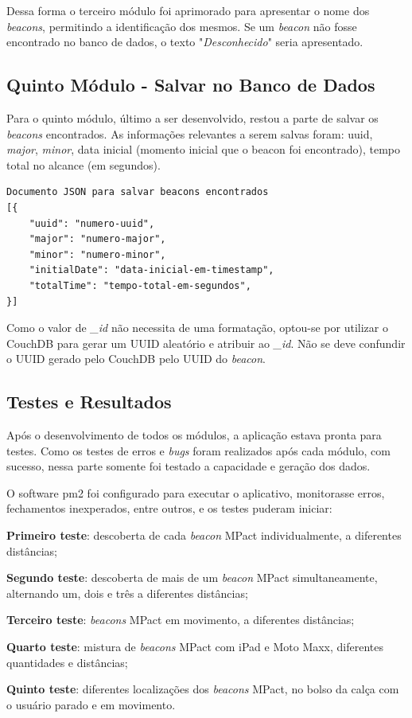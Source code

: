 \documentclass[
		12pt,				%
		openright,			%
		oneside,			%
		a4paper,			%
		chapter=TITLE,		%
		english,			%
		brazil				%
	]{abntex2}
\begin{document}
Dessa forma o terceiro módulo foi aprimorado para apresentar o nome dos \textit{beacons}, permitindo a identificação dos mesmos. Se um \textit{beacon} não fosse encontrado no banco de dados, o texto "\textit{Desconhecido}" seria apresentado.

\subsection{Quinto Módulo - Salvar no Banco de Dados}\label{sec:quinto-modulo}

Para o quinto módulo, último a ser desenvolvido, restou a parte de salvar os \textit{beacons} encontrados. As informações relevantes a serem salvas foram: uuid, \textit{major}, \textit{minor}, data inicial (momento inicial que o beacon foi encontrado), tempo total no alcance (em segundos). 

\begin{verbatim}
Documento JSON para salvar beacons encontrados
[{
    "uuid": "numero-uuid",
    "major": "numero-major",
    "minor": "numero-minor",
    "initialDate": "data-inicial-em-timestamp",
    "totalTime": "tempo-total-em-segundos",
}]
\end{verbatim}

Como o valor de \textit{\_id} não necessita de uma formatação, optou-se por utilizar o CouchDB para gerar um UUID aleatório e atribuir ao \textit{\_id}. Não se deve confundir o UUID gerado pelo CouchDB pelo UUID do \textit{beacon}.

\subsection{Testes e Resultados}\label{sec:testes-resultados}

Após o desenvolvimento de todos os módulos, a aplicação estava pronta para testes. Como os testes de erros e \textit{bugs} foram realizados após cada módulo, com sucesso, nessa parte somente foi testado a capacidade e geração dos dados.

O software pm2 foi configurado para executar o aplicativo, monitorasse erros, fechamentos inexperados, entre outros, e os testes puderam iniciar:

\begin{alineas}
	\item \textbf{Primeiro teste}: descoberta de cada \textit{beacon} MPact individualmente, a diferentes distâncias;
	\item \textbf{Segundo teste}: descoberta de mais de um \textit{beacon} MPact simultaneamente, alternando um, dois e três a diferentes distâncias;
	\item \textbf{Terceiro teste}: \textit{beacons} MPact em movimento, a diferentes distâncias;
	\item \textbf{Quarto teste}: mistura de \textit{beacons} MPact com iPad e Moto Maxx, diferentes quantidades e distâncias;
	\item \textbf{Quinto teste}: diferentes localizações dos \textit{beacons} MPact, no bolso da calça com o usuário parado e em movimento.
\end{alineas}
\end{document}
